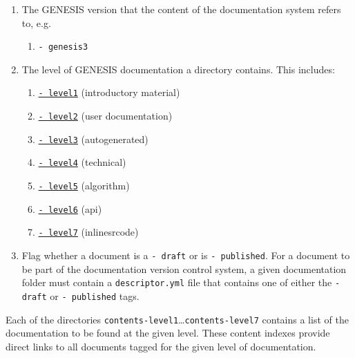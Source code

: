 \documentclass[12pt]{article}
\begin{document}
\begin{enumerate}

\item The GENESIS version that the content of the documentation system refers to, e.g.
\begin{enumerate}
\item  {\tt - genesis3}
\end{enumerate}

\item The level of GENESIS documentation a directory contains. This includes:

	\begin{enumerate}

	\item \href{../contents-level1/contents-level1.pdf}{{\tt - level1}} (introductory material)

	\item \href{../contents-level2/contents-level2.pdf}{{\tt - level2}} (user documentation)

	\item \href{../contents-level3/contents-level3.pdf}{{\tt - level3}} (autogenerated)

	\item \href{../contents-level4/contents-level4.pdf}{{\tt - level4}} (technical)

	\item \href{../contents-level5/contents-level5.pdf}{{\tt - level5}} (algorithm)

	\item \href{../contents-level6/contents-level6.pdf}{{\tt - level6}} (api)

	\item \href{../contents-level7/contents-level7.pdf}{{\tt - level7}} (inlinesrcode)

	\end{enumerate}

\item Flag whether a document is a {\tt - draft} or is {\tt - published}. For a document to be part of the documentation version control system, a given documentation folder must contain a {\tt descriptor.yml} file that contains one of either the {\tt - draft} or {\tt - published} tags.

\end{enumerate}

Each of the directories {\tt contents-level1}\ldots {\tt contents-level7} contains a list of the documentation to be found at the given level. These content indexes provide direct links to all documents tagged for the given level of documentation.
\end{document}

